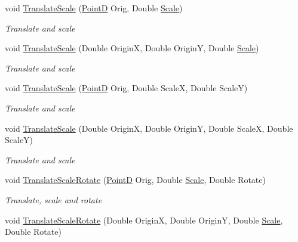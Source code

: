 \begin{DoxyCompactItemize}
void \hyperlink{class_pdf_file_writer_1_1_pdf_contents_a863432cb4d471567eb269724fe0c6233}{Translate\+Scale} (\hyperlink{class_pdf_file_writer_1_1_point_d}{PointD} Orig, Double \hyperlink{class_pdf_file_writer_1_1_pdf_contents_af2d7cc040971ee1a57c0c5d3fbb888a5}{Scale})
\begin{DoxyCompactList}\small\item\em Translate and scale \end{DoxyCompactList}\item 
void \hyperlink{class_pdf_file_writer_1_1_pdf_contents_a02d6a638b580bcbb9b1cb7fab4c3afc9}{Translate\+Scale} (Double OriginX, Double OriginY, Double \hyperlink{class_pdf_file_writer_1_1_pdf_contents_af2d7cc040971ee1a57c0c5d3fbb888a5}{Scale})
\begin{DoxyCompactList}\small\item\em Translate and scale \end{DoxyCompactList}\item 
void \hyperlink{class_pdf_file_writer_1_1_pdf_contents_a2ea234b935c5bec3ec64126472b0dcfb}{Translate\+Scale} (\hyperlink{class_pdf_file_writer_1_1_point_d}{PointD} Orig, Double ScaleX, Double ScaleY)
\begin{DoxyCompactList}\small\item\em Translate and scale \end{DoxyCompactList}\item 
void \hyperlink{class_pdf_file_writer_1_1_pdf_contents_a78661d85c54a5fec0928429539b72463}{Translate\+Scale} (Double OriginX, Double OriginY, Double ScaleX, Double ScaleY)
\begin{DoxyCompactList}\small\item\em Translate and scale \end{DoxyCompactList}\item 
void \hyperlink{class_pdf_file_writer_1_1_pdf_contents_afebfb36cfba7ab21d7cf4f57e463c005}{Translate\+Scale\+Rotate} (\hyperlink{class_pdf_file_writer_1_1_point_d}{PointD} Orig, Double \hyperlink{class_pdf_file_writer_1_1_pdf_contents_af2d7cc040971ee1a57c0c5d3fbb888a5}{Scale}, Double Rotate)
\begin{DoxyCompactList}\small\item\em Translate, scale and rotate \end{DoxyCompactList}\item 
void \hyperlink{class_pdf_file_writer_1_1_pdf_contents_ab4f156b79679531dff488650b83fb503}{Translate\+Scale\+Rotate} (Double OriginX, Double OriginY, Double \hyperlink{class_pdf_file_writer_1_1_pdf_contents_af2d7cc040971ee1a57c0c5d3fbb888a5}{Scale}, Double Rotate)

\end{DoxyCompactItemize}
